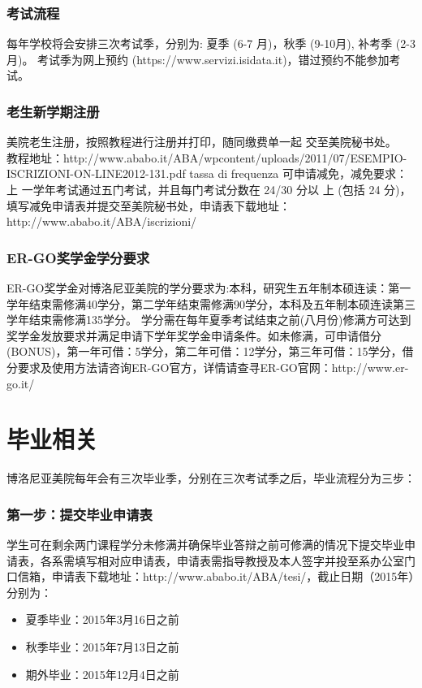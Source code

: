 \subsubsection{考试流程}
每年学校将会安排三次考试季，分别为: 夏季 (6-7 月)，秋季 (9-10月), 补考季 (2-3月)。
考试季为网上预约 (https://www.servizi.isidata.it)，错过预约不能参加考试。
\subsubsection{老生新学期注册}
美院老生注册，按照教程进行注册并打印，随同缴费单一起 交至美院秘书处。\\
教程地址：http://www.ababo.it/ABA/wpcontent/uploads/2011/07/ESEMPIO-ISCRIZIONI-ON-LINE2012-131.pdf tassa di frequenza
可申请减免，减免要求：上 一学年考试通过五门考试，并且每门考试分数在 24/30 分以 上 (包括 24 分)，填写减免申请表并提交至美院秘书处，申请表下载地址：http://www.ababo.it/ABA/iscrizioni/
\subsubsection{ER-GO奖学金学分要求}
ER-GO奖学金对博洛尼亚美院的学分要求为:本科，研究生五年制本硕连读：第一学年结束需修满40学分，第二学年结束需修满90学分，本科及五年制本硕连读第三学年结束需修满135学分。
学分需在每年夏季考试结束之前(八月份)修满方可达到奖学金发放要求并满足申请下学年奖学金申请条件。如未修满，可申请借分(BONUS)，第一年可借：5学分，第二年可借：12学分，第三年可借：15学分，借分要求及使用方法请咨询ER-GO官方，详情请查寻ER-GO官网：http://www.er-go.it/

\section{毕业相关}
博洛尼亚美院每年会有三次毕业季，分别在三次考试季之后，毕业流程分为三步：

\subsubsection{第一步：提交毕业申请表}
学生可在剩余两门课程学分未修满并确保毕业答辩之前可修满的情况下提交毕业申请表，各系需填写相对应申请表，申请表需指导教授及本人签字并投至系办公室门口信箱，申请表下载地址：http://www.ababo.it/ABA/tesi/，截止日期（2015年）分别为：

\begin{itemize}
  \item 夏季毕业：2015年3月16日之前
  \item 秋季毕业：2015年7月13日之前
  \item 期外毕业：2015年12月4日之前
\end{itemize}


